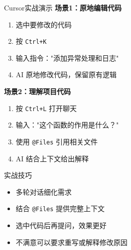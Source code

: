 \begin{frame}{Cursor实战演示}
	\textbf{场景1：原地编辑代码}
	\begin{enumerate}
		\item 选中要修改的代码
		\item 按 \texttt{Ctrl+K}
		\item 输入指令："添加异常处理和日志"
		\item AI 原地修改代码，保留原有逻辑
	\end{enumerate}

	\vspace{0.3cm}

	\textbf{场景2：理解项目代码}
	\begin{enumerate}
		\item 按 \texttt{Ctrl+L} 打开聊天
		\item 输入："这个函数的作用是什么？"
		\item 使用 \texttt{@Files} 引用相关文件
		\item AI 结合上下文给出解释
	\end{enumerate}

	\vspace{0.3cm}

	\begin{exampleblock}{实战技巧}
		\begin{itemize}
			\item 多轮对话细化需求
			\item 结合 \texttt{@Files} 提供完整上下文
			\item 选中代码后再提问，效果更好
			\item 不满意可以要求重写或解释修改原因
		\end{itemize}
	\end{exampleblock}
\end{frame}


